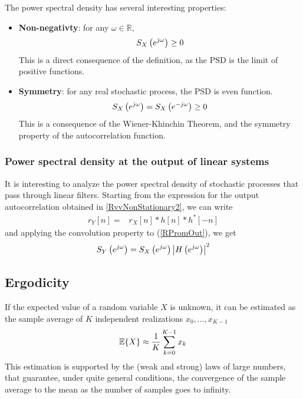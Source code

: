 The power spectral density has several interesting properties:

\begin{itemize}
\item \textbf{Non-negativty}: for any $\omega \in \mathbb{R}$,
\begin{equation}
S_X\left(e^{j \omega}\right) \ge 0
\end{equation}
This is a direct consequence of the definition, as the PSD is the limit of positive functions.
\item \textbf{Symmetry}: for any real stochastic process, the PSD is even function.
\begin{equation}
S_X\left(e^{j \omega}\right) = S_X\left(e^{-j \omega}\right) \ge 0
\end{equation}
This is a consequence of the Wiener-Khinchin Theorem, and the symmetry property of the autocorrelation function.
\end{itemize}


\subsubsection{Power spectral density at the output of linear systems}

It is interesting to analyze the power spectral density of stochastic processes that pass through linear filters. Starting from the expression for the output autocorrelation obtained in \eqref{RvvNonStationary2}, we can write
\begin{eqnarray}
r_Y[n] =&  r_X[n] * h[n] * h^*[-n]
\label{RPromOut}
\end{eqnarray}
and applying the convolution property to (\ref{RPromOut}), we get
\begin{equation}
S_Y\left(e^{j \omega}\right) = S_X\left(e^{j \omega}\right) \left| H\left(e^{j \omega}\right) \right|^2
\label{depout}
\end{equation}


\subsection{Ergodicity}
\label{sec:Ergodicity}

If the expected value of a random variable $X$ is unknown, it can be estimated as the sample average of $K$ independent realizations $x_0,\ldots, x_{K-1}$
\begin{equation}
\mathbb{E}\{X\} \approx \frac{1}{K} \sum_{k=0}^{K-1} x_k
\end{equation}
This estimation is supported by the (weak and strong) laws of large numbers, that guarantee, under quite general conditions, the convergence of the sample average to the mean as the number of samples goes to infinity.

